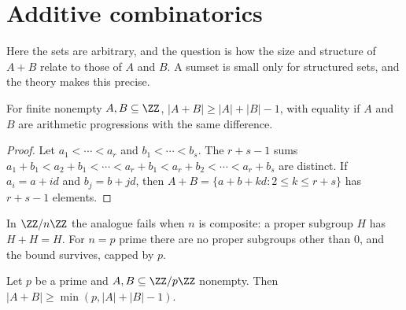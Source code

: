 \section{Additive combinatorics}\label{additive-number-theory:section-combinatorics}

Here the sets are arbitrary, and the question is how the size and structure of $A + B$ relate to those of $A$ and $B$. A sumset is small only for structured sets, and the theory makes this precise.

\begin{proposition}\label{additive-number-theory:proposition-sumset-integers}
For finite nonempty $A, B \subseteq \ZZ$, $|A + B| \geq |A| + |B| - 1$, with equality if $A$ and $B$ are arithmetic progressions with the same difference.
\end{proposition}

\begin{proof}
Let $a_1 < \cdots < a_r$ and $b_1 < \cdots < b_s$. The $r + s - 1$ sums $a_1 + b_1 < a_2 + b_1 < \cdots < a_r + b_1 < a_r + b_2 < \cdots < a_r + b_s$ are distinct. If $a_i = a + id$ and $b_j = b + jd$, then
$A + B = \{a + b + kd : 2 \leq k \leq r + s\}$ has $r + s - 1$ elements.
\end{proof}

In $\ZZ/n\ZZ$ the analogue fails when $n$ is composite: a proper subgroup $H$ has $H + H = H$. For $n = p$ prime there are no proper subgroups other than $0$, and the bound survives, capped by $p$.

\begin{theorem}\label{additive-number-theory:theorem-cauchy-davenport}
Let $p$ be a prime and $A, B \subseteq \ZZ/p\ZZ$ nonempty. Then $|A + B| \geq \min(p, |A| + |B| - 1)$.
\end{theorem}

